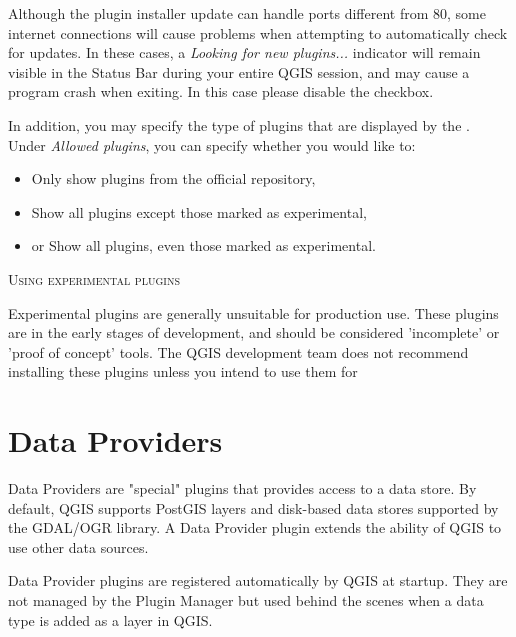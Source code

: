 Although the plugin installer update can handle ports different from 80, some internet
connections will cause problems when attempting to automatically check for updates.
In these cases, a \textit{Looking for new plugins...} indicator will
remain visible in the Status Bar during your entire QGIS session, and may cause a
program crash when exiting. In this case please disable the checkbox.

In addition, you may specify the type of plugins that are displayed by the . Under \textit{Allowed plugins}, you can specify whether you would like to:

\begin{itemize}[label=--]
\item Only show plugins from the official repository,
\item Show all plugins except those marked as experimental,
\item or Show all plugins, even those marked as experimental.
\end{itemize}

\begin{Tip}
 \caption{\textsc{Using experimental plugins}}
Experimental plugins are generally unsuitable for production use. These plugins are in the early stages of development, and should be considered 'incomplete' or 'proof of concept' tools. The QGIS development team does not recommend installing these plugins unless you intend to use them for
\end{Tip}

\section{Data Providers}

Data Providers are "special" plugins that provides access to a data store.
By default, QGIS supports PostGIS layers and disk-based data stores supported by the GDAL/OGR library.
A Data Provider plugin extends the ability of QGIS to use other data sources.

Data Provider plugins are registered automatically by QGIS at startup.
They are not managed by the Plugin Manager but used behind the scenes when a data type is added as a layer in QGIS.

\FloatBarrier
